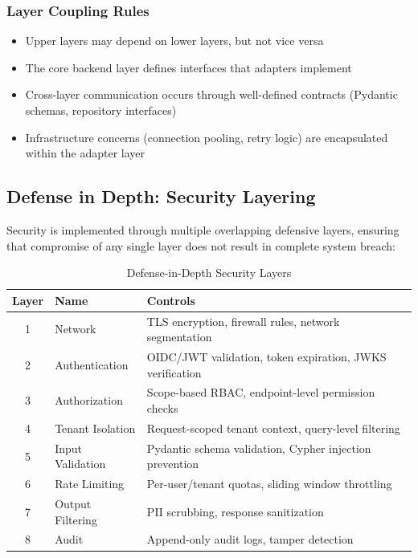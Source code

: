 \documentclass[a4paper,twoside]{sapthesis}
\begin{document}
\subsubsection{Layer Coupling Rules}

\begin{itemize}
    \item Upper layers may depend on lower layers, but not vice versa
    \item The core backend layer defines interfaces that adapters implement
    \item Cross-layer communication occurs through well-defined contracts (Pydantic schemas, repository interfaces)
    \item Infrastructure concerns (connection pooling, retry logic) are encapsulated within the adapter layer
\end{itemize}

\subsection{Defense in Depth: Security Layering}
\label{subsec:defense-in-depth}

Security is implemented through multiple overlapping defensive layers, ensuring that compromise of any single layer does not result in complete system breach:

\begin{table}[htbp]
\centering
\caption{Defense-in-Depth Security Layers}
\label{tab:security-layers}
\small
\begin{tabular}{|c|l|p{7cm}|}
\hline
\textbf{Layer} & \textbf{Name} & \textbf{Controls} \\
\midrule
1 & Network & TLS encryption, firewall rules, network segmentation \\
\midrule
2 & Authentication & OIDC/JWT validation, token expiration, JWKS verification \\
\midrule
3 & Authorization & Scope-based RBAC, endpoint-level permission checks \\
\midrule
4 & Tenant Isolation & Request-scoped tenant context, query-level filtering \\
\midrule
5 & Input Validation & Pydantic schema validation, Cypher injection prevention \\
\midrule
6 & Rate Limiting & Per-user/tenant quotas, sliding window throttling \\
\midrule
7 & Output Filtering & PII scrubbing, response sanitization \\
\midrule
8 & Audit & Append-only audit logs, tamper detection \\
\midrule
\end{tabular}
\end{table}
\end{document}
